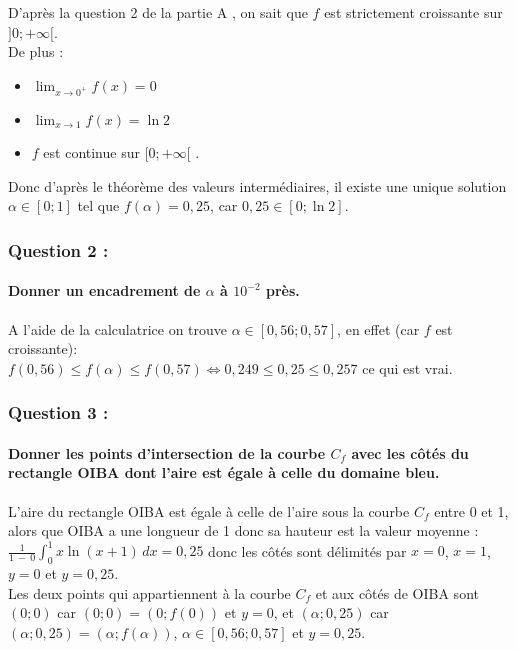 \documentclass[a4paper, 12pt]{article}
\begin{document}
D'après la question 2 de la partie A , on sait que $f$ est strictement croissante sur $]0;+\infty[$.
\\
De plus : 
\\
\begin{itemize}
    \item[\textbullet] $ \displaystyle \lim_{x \to 0^+}f(x)=0$ \\[1mm]
    \item[\textbullet] $ \displaystyle \lim_{x \to 1}f(x) = \ln{2} $ \\[1mm]
    \item[\textbullet] $f$ est continue sur $[0;+\infty[$ .\\[1mm]
\end{itemize}
Donc d'après le théorème des valeurs intermédiaires, il existe une unique solution $\alpha \in [0;1]$ tel que $f(\alpha) = 0,25$, car $0,25 \in [0;\ln{2}]$.

{}
\subsubsection*{Question 2 :}
\paragraph*{Donner un encadrement de $\alpha$ à $10^{-2}$ près.\\[5mm]}

A l'aide de la calculatrice on trouve $\alpha \in [0,56;0,57]$, en effet (car $f$ est croissante): 
\\
$f(0,56) \leq f(\alpha) \leq f(0,57) \iff 0,249 \leq 0,25 \leq 0,257$ ce qui est vrai.

{}
\subsubsection*{Question 3 :}
\paragraph*{Donner les points d'intersection de la courbe $C_f$ avec les côtés du rectangle OIBA dont l'aire est égale à celle du domaine bleu.\\[5mm]}

L'aire du rectangle OIBA est égale à celle de l'aire sous la courbe $C_f$ entre 0 et 1, alors que OIBA a une longueur de 1 donc sa hauteur est la valeur moyenne :
\\
$\frac{1}{1\ -\ 0}\displaystyle \int_0^1 x\ln{\left(x+1\right)} \,dx = 0,25$ donc les côtés sont délimités par $x=0$, $x=1$, $y=0$ et $y=0,25$.
\\ 
Les deux points qui appartiennent à la courbe $C_f$ et aux côtés de OIBA sont $(0;0)$ car $(0;0) = (0;f(0))$ et $y=0$, 
et $(\alpha;0,25)$ car $(\alpha;0,25) = (\alpha;f(\alpha))$, $\alpha \in[0,56;0,57]$ et $y=0,25$.
\end{document}
